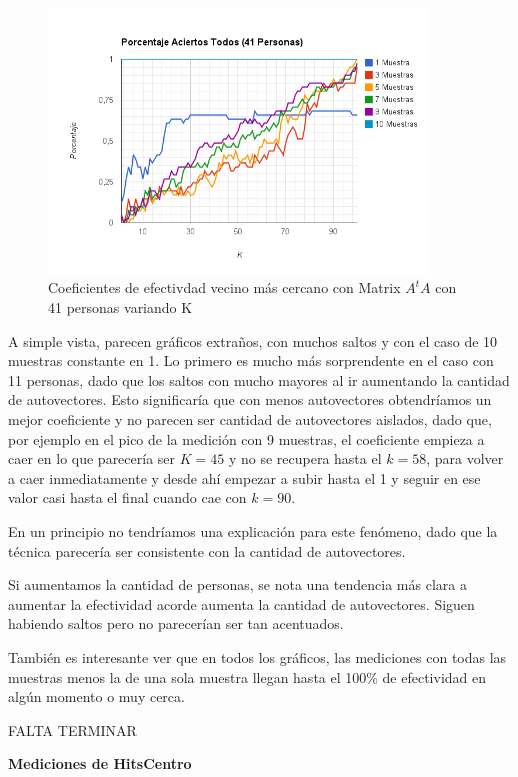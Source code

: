 \begin{figure}[H]
\includegraphics[width=0.90\textwidth]{img/image12.png}
     \caption{Coeficientes de efectivdad vecino más cercano con Matrix $A^tA$ con 41 personas variando K}
\end{figure}

A simple vista, parecen gráficos extraños, con muchos saltos y con el caso de 10 muestras constante
en 1. Lo primero es mucho más sorprendente en el caso con 11 personas, dado que los saltos con mucho
mayores al ir aumentando la cantidad de autovectores. Esto significaría que con menos autovectores
obtendríamos un mejor coeficiente y no parecen ser cantidad de autovectores aislados, dado que, por
ejemplo en el pico de la medición con 9 muestras, el coeficiente empieza a caer en lo que parecería
ser $K=45$ y no se recupera hasta el $k=58$, para volver a caer inmediatamente y desde ahí empezar a
subir hasta el 1 y seguir en ese valor casi hasta el final cuando cae con $k=90$.

En un principio no tendríamos una explicación para este fenómeno, dado que la técnica parecería ser
consistente con la cantidad de autovectores.

Si aumentamos la cantidad de personas, se nota una tendencia más clara a aumentar la efectividad
acorde aumenta la cantidad de autovectores. Siguen habiendo saltos pero no parecerían ser tan
acentuados.

También es interesante ver que en todos los gráficos, las mediciones con todas las muestras menos la
de una sola muestra llegan hasta el 100\% de efectividad en algún momento o muy cerca.

FALTA TERMINAR



\textbf{Mediciones de HitsCentro }

